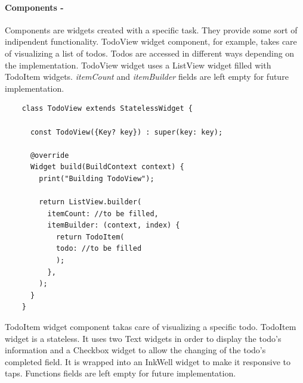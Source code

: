 	\paragraph{Components - } 
	\label{par:todo_app_components}
	Components are widgets created with a specific task. They provide some sort of indipendent functionality.
	TodoView widget component, for example, takes care of visualizing a list of todos. Todos are accessed in different ways depending on the implementation. TodoView widget uses a ListView widget filled with TodoItem widgets. \textit{itemCount} and \textit{itemBuilder} fields are left empty for future implementation.
\mbox{}
	\begin{code}
	 \mbox{}
			\label{code:2.9}
	\begin{verbatim}
	class TodoView extends StatelessWidget {
	
	  const TodoView({Key? key}) : super(key: key);
	
	  @override
	  Widget build(BuildContext context) {
	    print("Building TodoView");
	
	    return ListView.builder(
	      itemCount: //to be filled,
	      itemBuilder: (context, index) {
	        return TodoItem(
	        todo: //to be filled 
	        );
	      },
	    );
	  }
	}
	\end{verbatim}
	\end{code}

TodoItem widget component takas care of visualizing a specific todo. TodoItem widget is a stateless. It uses two Text widgets in order to display the todo's information and a Checkbox widget to allow the changing of the todo’s completed field. It is wrapped into an InkWell widget to make it responsive to taps. Functions fields are left empty for future implementation.
	
